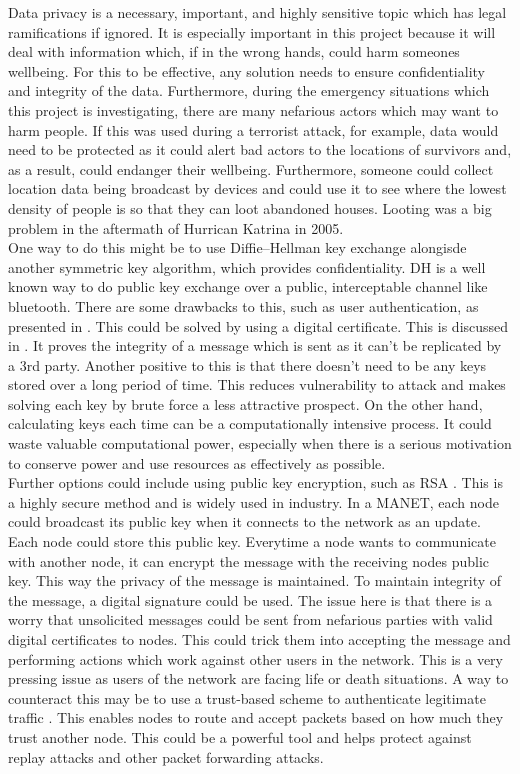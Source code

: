 \documentclass{report}
\begin{document}
Data privacy is a necessary, important, and highly sensitive topic which has legal ramifications if ignored. It is especially important in this project because it will 
deal with information which, if in the wrong hands, could harm someones wellbeing. For this to be effective, any solution needs to ensure confidentiality and integrity of the data.
Furthermore, during the emergency situations which this project is investigating, there are many nefarious actors which may want to harm people. If this was used during a terrorist 
attack, for example, data would need to be protected as it could alert bad actors to the locations of survivors and, as a result, could endanger their wellbeing. Furthermore, someone 
could collect location data being broadcast by devices and could use it to see where the lowest density of people is so that they can loot abandoned houses. Looting was a big problem 
in the aftermath of Hurrican Katrina in 2005\cite{nbcKatrina}.
\bigskip\\
One way to do this might be to use Diffie--Hellman key exchange\cite{li2010research, diffie1976new} alongisde another symmetric key algorithm, which provides confidentiality. DH is a well known way to do public key exchange over 
a public, interceptable channel like bluetooth. There are some drawbacks to this, such as user authentication, as presented in \cite{li2010research}. This could be solved by using a digital 
certificate. This is discussed in \cite{diffie1976new}. It proves the integrity of a message which is sent as it can't be replicated by a 3rd party. 
Another positive to this is that there doesn't need to be any keys stored over a long period of time. This reduces vulnerability to attack and makes solving 
each key by brute force a less attractive prospect. On the other hand, calculating keys each time can be a computationally intensive process. It could waste valuable 
computational power, especially when there is a serious motivation to conserve power and use resources as effectively as possible. 
\bigskip\\
Further options could include using public key encryption, such as RSA \cite{aufa2018security}. This is a highly secure method and is widely used in industry. In a MANET, each node could 
broadcast its public key when it connects to the network as an update. Each node could store this public key. Everytime a node wants to communicate with another node, it can 
encrypt the message with the receiving nodes public key. This way the privacy of the message is maintained. To maintain integrity of the message, a digital signature could be 
used. The issue here is that there is a worry that unsolicited messages could be sent from nefarious parties with valid digital certificates to nodes. This could trick them 
into accepting the message and performing actions which work against other users in the network. This is a very pressing issue as users of the network are facing life or 
death situations. A way to counteract this may be to use a trust-based scheme to authenticate legitimate traffic \cite{shah2016trust}. This 
enables nodes to route and accept packets based on how much they trust another node. This could be a powerful tool and helps protect against replay attacks and other 
packet forwarding attacks.
\end{document}
